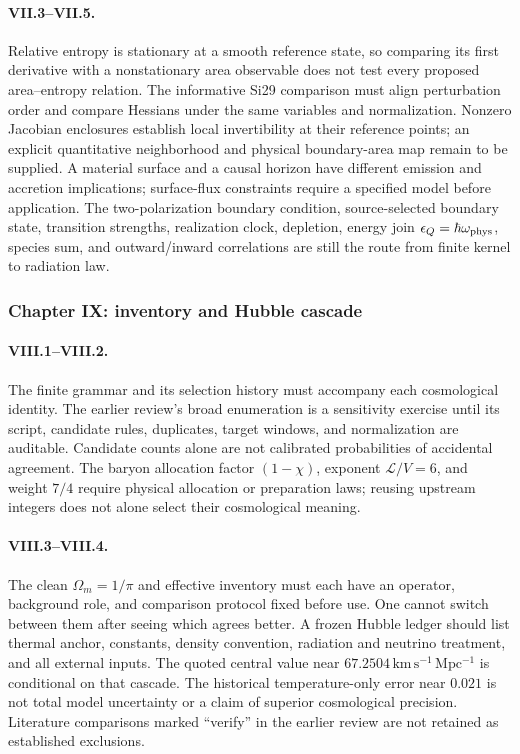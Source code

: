 \paragraph{VII.3--VII.5.}
Relative entropy is stationary at a smooth reference state, so comparing its first derivative with a nonstationary area observable does not test every proposed area--entropy relation. The informative Si29 comparison must align perturbation order and compare Hessians under the same variables and normalization. Nonzero Jacobian enclosures establish local invertibility at their reference points; an explicit quantitative neighborhood and physical boundary-area map remain to be supplied. A material surface and a causal horizon have different emission and accretion implications; surface-flux constraints require a specified model before application. The two-polarization boundary condition, source-selected boundary state, transition strengths, realization clock, depletion, energy join $\epsilon_Q=\hbar\omega_{\rm phys}$, species sum, and outward/inward correlations are still the route from finite kernel to radiation law.

\subsubsection*{Chapter IX: inventory and Hubble cascade}

\paragraph{VIII.1--VIII.2.}
The finite grammar and its selection history must accompany each cosmological identity. The earlier review's broad enumeration is a sensitivity exercise until its script, candidate rules, duplicates, target windows, and normalization are auditable. Candidate counts alone are not calibrated probabilities of accidental agreement. The baryon allocation factor $(1-\chi)$, exponent $\mathcal L/V=6$, and weight $7/4$ require physical allocation or preparation laws; reusing upstream integers does not alone select their cosmological meaning.

\paragraph{VIII.3--VIII.4.}
The clean $\Omega_m=1/\pi$ and effective inventory must each have an operator, background role, and comparison protocol fixed before use. One cannot switch between them after seeing which agrees better. A frozen Hubble ledger should list thermal anchor, constants, density convention, radiation and neutrino treatment, and all external inputs. The quoted central value near $67.2504\,\mathrm{km\,s^{-1}\,Mpc^{-1}}$ is conditional on that cascade. The historical temperature-only error near $0.021$ is not total model uncertainty or a claim of superior cosmological precision. Literature comparisons marked ``verify'' in the earlier review are not retained as established exclusions.

